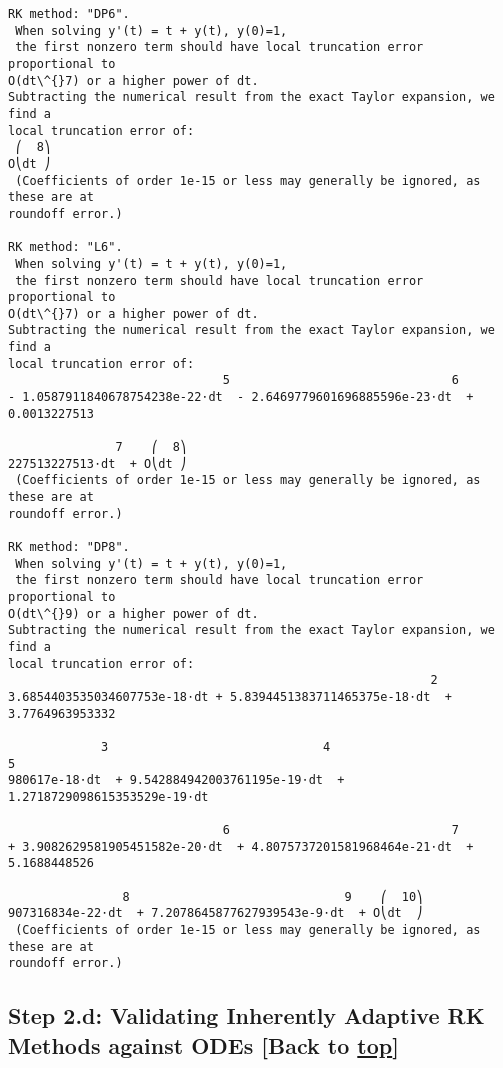 \documentclass[landscape,letterpaper,10pt,english]{article}
\begin{document}
\begin{Verbatim}[commandchars=\\\{\}]
RK method: "DP6".
 When solving y'(t) = t + y(t), y(0)=1,
 the first nonzero term should have local truncation error proportional to
O(dt\^{}7) or a higher power of dt.
Subtracting the numerical result from the exact Taylor expansion, we find a
local truncation error of:
 ⎛  8⎞
O⎝dt ⎠
 (Coefficients of order 1e-15 or less may generally be ignored, as these are at
roundoff error.)

RK method: "L6".
 When solving y'(t) = t + y(t), y(0)=1,
 the first nonzero term should have local truncation error proportional to
O(dt\^{}7) or a higher power of dt.
Subtracting the numerical result from the exact Taylor expansion, we find a
local truncation error of:
                              5                               6
- 1.0587911840678754238e-22⋅dt  - 2.6469779601696885596e-23⋅dt  + 0.0013227513

               7    ⎛  8⎞
227513227513⋅dt  + O⎝dt ⎠
 (Coefficients of order 1e-15 or less may generally be ignored, as these are at
roundoff error.)

RK method: "DP8".
 When solving y'(t) = t + y(t), y(0)=1,
 the first nonzero term should have local truncation error proportional to
O(dt\^{}9) or a higher power of dt.
Subtracting the numerical result from the exact Taylor expansion, we find a
local truncation error of:
                                                           2
3.6854403535034607753e-18⋅dt + 5.8394451383711465375e-18⋅dt  + 3.7764963953332

             3                              4                               5
980617e-18⋅dt  + 9.542884942003761195e-19⋅dt  + 1.2718729098615353529e-19⋅dt

                              6                               7
+ 3.9082629581905451582e-20⋅dt  + 4.8075737201581968464e-21⋅dt  + 5.1688448526

                8                              9    ⎛  10⎞
907316834e-22⋅dt  + 7.2078645877627939543e-9⋅dt  + O⎝dt  ⎠
 (Coefficients of order 1e-15 or less may generally be ignored, as these are at
roundoff error.)

    \end{Verbatim}

    \hypertarget{step-2.d-validating-inherently-adaptive-rk-methods-against-odes-back-to-top}{%
\subsection{\texorpdfstring{Step 2.d: Validating Inherently Adaptive RK
Methods against ODEs {[}Back to
\hyperref[toc]{top}{]}}{Step 2.d: Validating Inherently Adaptive RK Methods against ODEs {[}Back to {]}}}\label{step-2.d-validating-inherently-adaptive-rk-methods-against-odes-back-to-top}}
\end{document}
